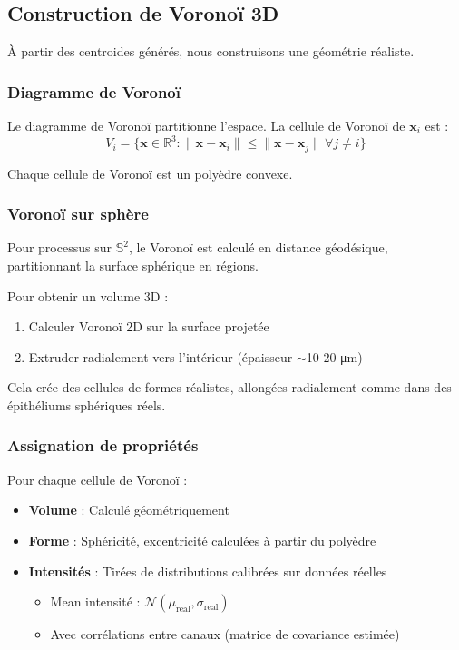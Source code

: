 \subsection{Construction de Voronoï 3D}

À partir des centroides générés, nous construisons une géométrie réaliste.

\subsubsection{Diagramme de Voronoï}

Le diagramme de Voronoï partitionne l'espace. La cellule de Voronoï de $\mathbf{x}_i$ est :
\[
V_i = \{\mathbf{x} \in \mathbb{R}^3 : \|\mathbf{x} - \mathbf{x}_i\| \leq \|\mathbf{x} - \mathbf{x}_j\| \, \forall j \neq i\}
\]

Chaque cellule de Voronoï est un polyèdre convexe.

\subsubsection{Voronoï sur sphère}

Pour processus sur $\mathbb{S}^2$, le Voronoï est calculé en distance géodésique, partitionnant la surface sphérique en régions.

Pour obtenir un volume 3D :
\begin{enumerate}
    \item Calculer Voronoï 2D sur la surface projetée
    \item Extruder radialement vers l'intérieur (épaisseur $\sim$10-20 μm)
\end{enumerate}

Cela crée des cellules de formes réalistes, allongées radialement comme dans des épithéliums sphériques réels.

\subsubsection{Assignation de propriétés}

Pour chaque cellule de Voronoï :
\begin{itemize}
    \item \textbf{Volume} : Calculé géométriquement
    \item \textbf{Forme} : Sphéricité, excentricité calculées à partir du polyèdre
    \item \textbf{Intensités} : Tirées de distributions calibrées sur données réelles
    \begin{itemize}
        \item Mean intensité : $\mathcal{N}(\mu_{\text{real}}, \sigma_{\text{real}})$
        \item Avec corrélations entre canaux (matrice de covariance estimée)
    \end{itemize}
\end{itemize}

